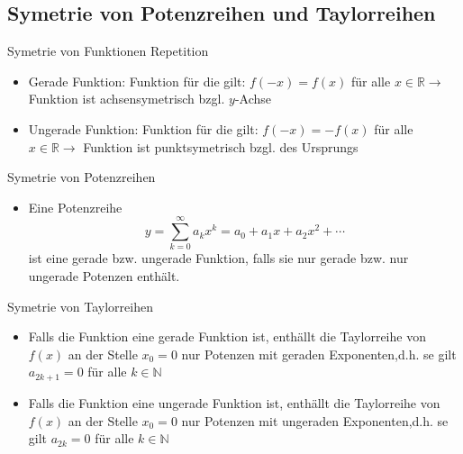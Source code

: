 \subsection{Symetrie von Potenzreihen und Taylorreihen}
\begin{lemma}{Symetrie von Funktionen Repetition}\\
  \begin{itemize}
    \item Gerade Funktion: Funktion für die gilt: \(f(-x)=f(x)\) für alle \(x\in\mathbb{R}\rightarrow\) Funktion ist
      achsensymetrisch bzgl. \(y\)-Achse
    \item Ungerade Funktion: Funktion für die gilt: \(f(-x)=-f(x)\) für alle \(x\in\mathbb{R}\rightarrow\) Funktion ist
      punktsymetrisch bzgl. des Ursprungs
  \end{itemize}
\end{lemma}
\begin{lemma}{Symetrie von Potenzreihen}\\
  \begin{itemize}
    \item Eine Potenzreihe
      \[y=\sum_{k=0}^{\infty}{a_kx^k}=a_0+a_1x+a_2x^2+\cdots\]
    ist eine gerade bzw. ungerade Funktion, falls sie nur gerade bzw. nur ungerade Potenzen enthält.
  \end{itemize}
\end{lemma}
\begin{lemma}{Symetrie von Taylorreihen}\\
  \begin{itemize}
    \item  Falls die Funktion eine gerade Funktion ist, enthällt die Taylorreihe von \(f(x)\) an der Stelle \(x_0 = 0\)
      nur Potenzen mit geraden Exponenten,d.h. se gilt \(a_{2k+1}=0\) für alle \(k\in\mathbb{N}\)
    \item  Falls die Funktion eine ungerade Funktion ist, enthällt die Taylorreihe von \(f(x)\) an der Stelle \(x_0 = 0\)
      nur Potenzen mit ungeraden Exponenten,d.h. se gilt \(a_{2k}=0\) für alle \(k\in\mathbb{N}\)
  \end{itemize}
\end{lemma}
